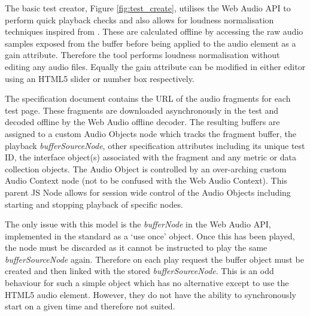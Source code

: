 \documentclass{sig-alternate}
\begin{document}
    The basic test creator, Figure \ref{fig:test_create}, utilises the Web Audio API to perform quick playback checks and also allows for loudness normalisation techniques inspired from \cite{ape}. These are calculated offline by accessing the raw audio samples exposed from the buffer before being applied to the audio element as a gain attribute. Therefore the tool performs loudness normalisation without editing any audio files. Equally the gain attribute can be modified in either editor using an HTML5 slider or number box respectively.

    
    The specification document contains the URL of the audio fragments for each test page. These fragments are downloaded asynchronously in the test and decoded offline by the Web Audio offline decoder. The resulting buffers are assigned to a custom Audio Objects node which tracks the fragment buffer, the playback \textit{bufferSourceNode}, other specification attributes including its unique test ID, the interface object(s) associated with the fragment and any metric or data collection objects. The Audio Object is controlled by an over-arching custom Audio Context node (not to be confused with the Web Audio Context). This parent JS Node allows for session wide control of the Audio Objects including starting and stopping playback of specific nodes.
    
    The only issue with this model is the \textit{bufferNode} in the Web Audio API, implemented in the standard as a `use once' object. Once this has been played, the node must be discarded as it cannot be instructed to play the same \textit{bufferSourceNode} again. Therefore on each play request the buffer object must be created and then linked with the stored \textit{bufferSourceNode}. This is an odd behaviour for such a simple object which has no alternative except to use the HTML5 audio element. However, they do not have the ability to synchronously start on a given time and therefore not suited.
    
\end{document}
